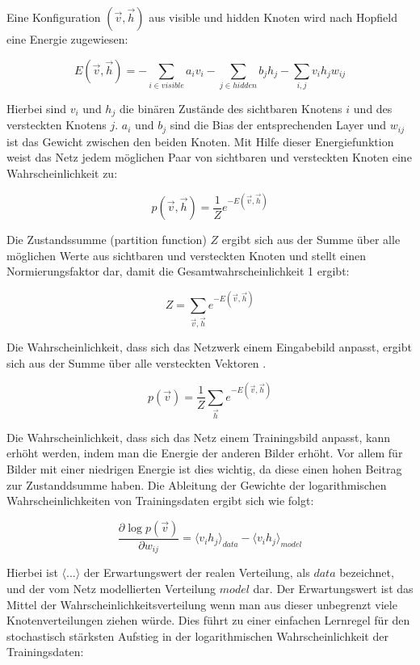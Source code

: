 \documentclass[12pt]{article}
\begin{document}
Eine Konfiguration $(\vec{v},\vec{h})$ aus visible und hidden Knoten wird nach Hopfield\cite{Hopfield} eine Energie zugewiesen:

\begin{equation}
E(\vec{v},\vec{h})= - \sum_{i \in visible} a_iv_i- \sum_{j \in hidden} b_j h_j - \sum_{i,j} v_i h_j w_{ij}
\end{equation}

Hierbei sind $v_i$ und $h_j$ die binären Zustände des sichtbaren Knotens $i$ und des versteckten Knotens $j$. $a_i$ und $b_j$ sind die Bias der entsprechenden Layer und $w_{ij}$ ist das Gewicht zwischen den beiden Knoten. Mit Hilfe dieser Energiefunktion weist das Netz jedem möglichen Paar von sichtbaren und versteckten Knoten eine Wahrscheinlichkeit zu:

\begin{equation}
p(\vec{v},\vec{h})= \frac{1}{Z} e^{-E(\vec{v},\vec{h})}
\end{equation}

Die Zustandssumme (partition function) $Z$ ergibt sich aus der Summe über alle möglichen Werte aus sichtbaren und versteckten Knoten und stellt einen Normierungsfaktor dar, damit die Gesamtwahrscheinlichkeit 1 ergibt:

\begin{equation}
Z=\sum_{\vec{v},\vec{h}} e^{-E(\vec{v},\vec{h})}
\end{equation}

Die Wahrscheinlichkeit, dass sich das Netzwerk einem Eingabebild anpasst, ergibt sich aus der Summe über alle versteckten Vektoren \cite{guide}.

\begin{equation}
p(\vec{v})= \frac{1}{Z} \sum_{\vec{h}} e^{-E(\vec{v},\vec{h})}
\end{equation}

Die Wahrscheinlichkeit, dass sich das Netz einem Trainingsbild anpasst, kann erhöht werden, indem man die Energie der anderen Bilder erhöht. Vor allem für Bilder mit einer niedrigen Energie ist dies wichtig, da diese einen hohen Beitrag zur Zustanddsumme haben. Die Ableitung der Gewichte der logarithmischen Wahrscheinlichkeiten von Trainingsdaten ergibt sich wie folgt:

\begin{equation}
\frac{\partial \log p(\vec{v})}{\partial w_{ij}} = \langle v_ih_j \rangle_{data} - \langle v_i h_j \rangle_{model}
\end{equation}

Hierbei ist $\langle...\rangle$ der Erwartungswert der realen Verteilung, als $data$ bezeichnet, und der vom Netz modellierten Verteilung $model$ dar. Der Erwartungswert ist das Mittel der Wahrscheinlichkeitsverteilung wenn man aus dieser unbegrenzt viele Knotenverteilungen ziehen würde. Dies führt zu einer einfachen Lernregel für den stochastisch stärksten Aufstieg in der logarithmischen Wahrscheinlichkeit der Trainingsdaten:
\end{document}
